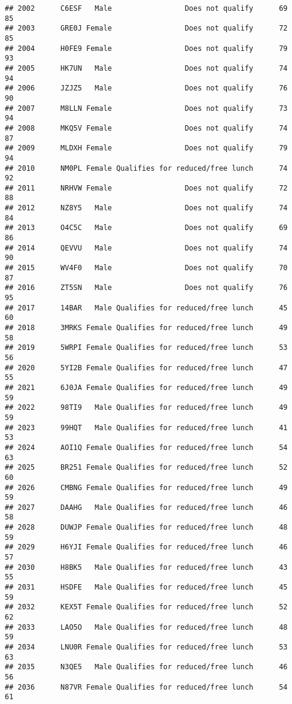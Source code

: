 \documentclass[
]{article}
\begin{document}
\begin{verbatim}
## 2002      C6ESF   Male                 Does not qualify      69       85
## 2003      GRE0J Female                 Does not qualify      72       85
## 2004      H0FE9 Female                 Does not qualify      79       93
## 2005      HK7UN   Male                 Does not qualify      74       94
## 2006      JZJZ5   Male                 Does not qualify      76       90
## 2007      M8LLN Female                 Does not qualify      73       94
## 2008      MKQ5V Female                 Does not qualify      74       87
## 2009      MLDXH Female                 Does not qualify      79       94
## 2010      NM0PL Female Qualifies for reduced/free lunch      74       92
## 2011      NRHVW Female                 Does not qualify      72       88
## 2012      NZ8Y5   Male                 Does not qualify      74       84
## 2013      O4C5C   Male                 Does not qualify      69       86
## 2014      QEVVU   Male                 Does not qualify      74       90
## 2015      WV4F0   Male                 Does not qualify      70       87
## 2016      ZT5SN   Male                 Does not qualify      76       95
## 2017      14BAR   Male Qualifies for reduced/free lunch      45       60
## 2018      3MRKS Female Qualifies for reduced/free lunch      49       58
## 2019      5WRPI Female Qualifies for reduced/free lunch      53       56
## 2020      5YI2B Female Qualifies for reduced/free lunch      47       55
## 2021      6J0JA Female Qualifies for reduced/free lunch      49       59
## 2022      98TI9   Male Qualifies for reduced/free lunch      49       59
## 2023      99HQT   Male Qualifies for reduced/free lunch      41       53
## 2024      AOI1Q Female Qualifies for reduced/free lunch      54       63
## 2025      BR251 Female Qualifies for reduced/free lunch      52       60
## 2026      CMBNG Female Qualifies for reduced/free lunch      49       59
## 2027      DAAHG   Male Qualifies for reduced/free lunch      46       58
## 2028      DUWJP Female Qualifies for reduced/free lunch      48       59
## 2029      H6YJI Female Qualifies for reduced/free lunch      46       57
## 2030      H8BK5   Male Qualifies for reduced/free lunch      43       55
## 2031      HSDFE   Male Qualifies for reduced/free lunch      45       59
## 2032      KEX5T Female Qualifies for reduced/free lunch      52       62
## 2033      LAO5O   Male Qualifies for reduced/free lunch      48       59
## 2034      LNU0R Female Qualifies for reduced/free lunch      53       63
## 2035      N3QE5   Male Qualifies for reduced/free lunch      46       56
## 2036      N87VR Female Qualifies for reduced/free lunch      54       61

\end{verbatim}
\end{document}
